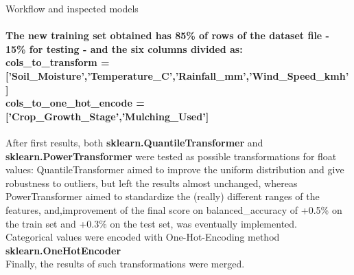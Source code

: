 \documentclass{beamer}
\begin{document}
\begin{frame}{Workflow and inspected models}

\paragraph{The new training set obtained has 85\% of rows of the dataset file - 15\% for testing - and the six columns divided as:\\
cols\_to\_transform = ['Soil\_Moisture','Temperature\_C','Rainfall\_mm','Wind\_Speed\_kmh']\\
cols\_to\_one\_hot\_encode = ['Crop\_Growth\_Stage','Mulching\_Used']}
\end{frame}



\begin{frame}
After first results, both \textbf{sklearn.QuantileTransformer} and \textbf{sklearn.PowerTransformer}  were tested as possible transformations for float values: QuantileTransformer  aimed to improve the uniform distribution and give robustness to outliers, but left the results almost unchanged, whereas PowerTransformer aimed to standardize the (really) different ranges of the features, and,improvement of the final score on balanced\_accuracy of +0.5\% on the train set and +0.3\% on the test set, was eventually implemented.
\\
Categorical values were encoded with One-Hot-Encoding method \textbf{sklearn.OneHotEncoder}
\\Finally, the results of such transformations were merged.
\end{frame}
\end{document}
